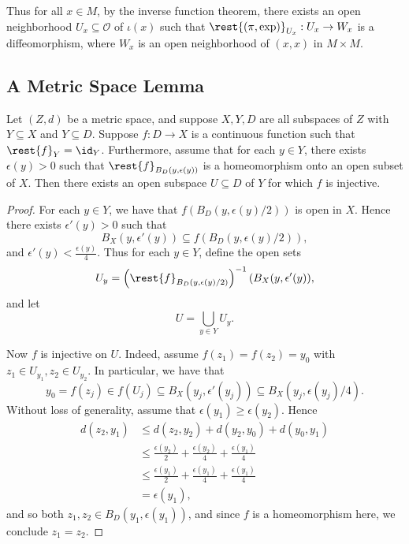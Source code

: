 Thus for all $x\in M$, by the inverse function theorem, there exists an open neighborhood $U_x\subseteq\mathcal{O}$ of $\iota(x)$ such that $\rest{(\pi,\exp)}_{U_x}:U_x\to W_x$ is a diffeomorphism, where $W_x$ is an open neighborhood of $(x,x)$ in $M\times M$.



\subsection{A Metric Space Lemma}

\begin{lem}\label{thm:metricSpaceLem}
    Let $(Z,d)$ be a metric space, and suppose $X,Y,D$ are all subspaces of $Z$ with $Y\subseteq X$ and $Y\subseteq D$.  Suppose $f:D\to X$ is a continuous function such that $\rest{f}_Y=\id_Y$.  Furthermore, assume that for each $y\in Y$, there exists $\epsilon(y)>0$ such that $\rest{f}_{B_D(y,\epsilon(y))}$ is a homeomorphism onto an open subset of $X$.  Then there exists an open subspace $U\subseteq D$ of $Y$ for which $f$ is injective.
\end{lem}

\begin{proof}
For each $y\in Y$, we have that $f(B_D(y,\epsilon(y)/2))$ is open in $X$.  Hence there exists $\epsilon'(y)>0$ such that
$$B_X(y,\epsilon'(y))\subseteq f(B_D(y,\epsilon(y)/2)),$$
and $\epsilon'(y)<\frac{\epsilon(y)}{4}.$  Thus for each $y\in Y$, define the open sets
$$U_y=\left(\rest{f}_{B_D(y,\epsilon(y)/2)}\right)^{-1}(B_X(y,\epsilon'(y)),$$
and let
$$U=\bigcup_{y\in Y}U_y.$$

Now $f$ is injective on $U$.  Indeed, assume $f(z_1)=f(z_2)=y_0$ with $z_1\in U_{y_1}, z_2\in U_{y_2}$.  In particular, we have that
$$y_0=f(z_j)\in f(U_j)\subseteq B_X(y_j,\epsilon'(y_j))\subseteq B_X(y_j,\epsilon(y_j)/4).$$
Without loss of generality, assume that $\epsilon(y_1)\geq\epsilon(y_2)$.  Hence
\begin{align*}
	d(z_2,y_1)&\leq d(z_2,y_2)+d(y_2,y_0)+d(y_0,y_1)\\
	&\leq \frac{\epsilon(y_2)}{2}+\frac{\epsilon(y_2)}{4}+\frac{\epsilon(y_1)}{4}\\
	&\leq\frac{\epsilon(y_1)}{2}+\frac{\epsilon(y_1)}{4}+\frac{\epsilon(y_1)}{4}\\
	&=\epsilon(y_1),
\end{align*}
and so both $z_1,z_2\in B_D(y_1,\epsilon(y_1))$, and since $f$ is a homeomorphism here, we conclude $z_1=z_2$.
\end{proof}

